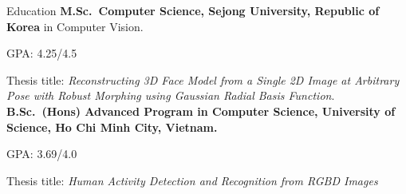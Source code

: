 \begin{rubric}{Education}
\entry*[03/2017 -- Present]%
	\textbf{M.Sc.~Computer Science, Sejong University, Republic of Korea} in Computer Vision.\par
	GPA: 4.25/4.5 \par
 	Thesis title: \emph{Reconstructing 3D Face Model from a Single 2D Image at Arbitrary Pose with Robust Morphing using Gaussian Radial Basis Function}.
%
\entry*[10/2012 -- 11/2016]%
	\textbf{B.Sc.~(Hons) Advanced Program in Computer Science, University of Science, Ho Chi Minh City, Vietnam.}\par
    GPA: 3.69/4.0 \par 
    Thesis title: \emph{Human Activity Detection and Recognition from RGBD Images}
	
%
\end{rubric}